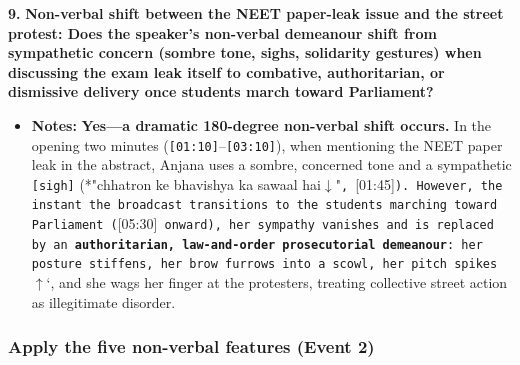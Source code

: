 \documentclass[10pt,a4paper]{article}
\begin{document}
\noindent\textbf{9.} \textbf{Non-verbal shift between the NEET paper-leak issue and the street protest: Does the speaker's non-verbal demeanour shift from sympathetic concern (sombre tone, sighs, solidarity gestures) when discussing the exam leak itself to combative, authoritarian, or dismissive delivery once students march toward Parliament?}\par\smallskip
\begin{itemize}
  \item \textbf{Notes:}
\textbf{Yes---a dramatic 180-degree non-verbal shift occurs.} In the opening two minutes (\texttt{[01:10]}--\texttt{[03:10]}), when mentioning the NEET paper leak in the abstract, Anjana uses a sombre, concerned tone and a sympathetic \texttt{[sigh]} (*"chhatron ke bhavishya ka sawaal hai$\downarrow$"\texttt{, }[01:45]\texttt{). However, the instant the broadcast transitions to the students marching toward Parliament (}[05:30]\texttt{ onward), her sympathy vanishes and is replaced by an \textbf{authoritarian, law-and-order prosecutorial demeanour}: her posture stiffens, her brow furrows into a scowl, her pitch spikes }$\uparrow$`, and she wags her finger at the protesters, treating collective street action as illegitimate disorder.\par\smallskip
\end{itemize}

\subsubsection*{Apply the five non-verbal features (Event 2)}
\end{document}
